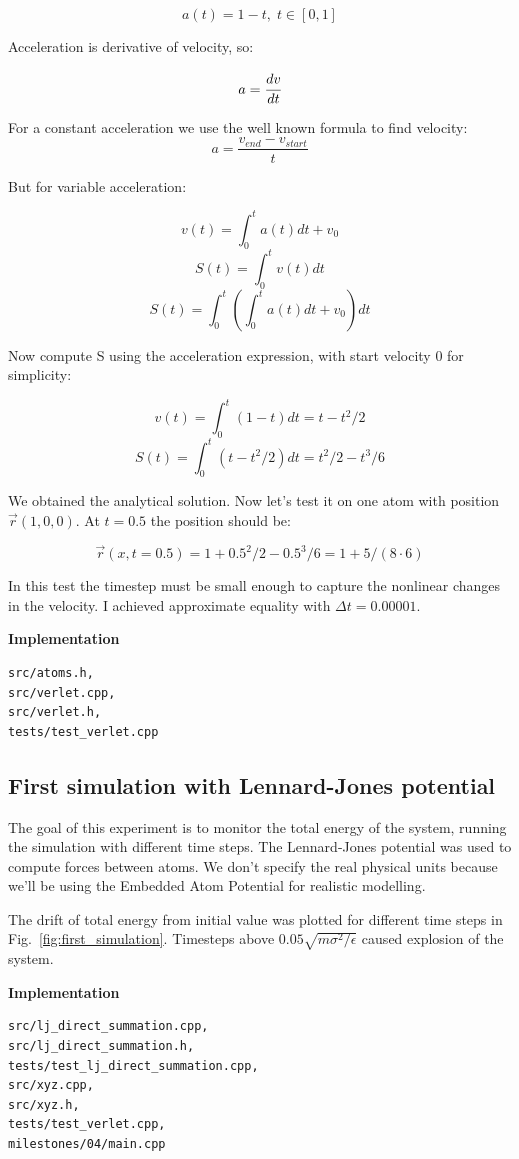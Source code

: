\documentclass[12pt,a4paper]{article}
\newcommand{\mat}[1]{\vec{#1}}
\begin{document}
\[ a(t) = 1 - t,\; t \in [0, 1] \]

Acceleration is derivative of velocity, so:

\[ a = \cfrac{dv}{dt} \]

For a constant acceleration we use the well known formula to find velocity: \[ a = \frac{v_{end}-v_{start}}{t} \]

But for variable acceleration:

\[ v(t) = \int_0^t a(t) dt + v_0 \]
\[ S(t) = \int_0^t v(t) dt \]
\[ S(t) = \int_0^t \left( \int_0^t a(t) dt + v_0 \right) dt\]

Now compute S using the acceleration expression, with start velocity 0 for simplicity:

\[ v(t) = \int_0^t (1-t) dt = t - t^2 / 2\]
\[ S(t) = \int_0^t (t - t^2/2) dt = t^2/2 - t^3/6 \]

We obtained the analytical solution. Now let's test it on one atom with position $\mat{r}(1, 0, 0)$. At $t=0.5$ the position should be:

\[ \mat{r}(x, t=0.5) = 1 + 0.5^2/2 - 0.5^3/6 = 1 + 5/(8 \cdot 6)\]

In this test the timestep must be small enough to capture the nonlinear changes in the velocity. I achieved approximate equality with $\Delta t = 0.00001$.

\clearpage

{\bf Implementation}
\begin{lstlisting}[breaklines]
src/atoms.h,
src/verlet.cpp,
src/verlet.h,
tests/test_verlet.cpp
\end{lstlisting}

\clearpage

\subsection*{First simulation with Lennard-Jones potential}

The goal of this experiment is to monitor the total energy of the system, running the simulation with different time steps. The Lennard-Jones potential was used to compute forces between atoms. We don't specify the real physical units because we'll be using the Embedded Atom Potential for realistic modelling.

The drift of total energy from initial value was plotted for different time steps in Fig.~\ref{fig:first_simulation}. Timesteps above $0.05 \sqrt{m\sigma^2 / \epsilon}$ caused explosion of the system.

{\bf Implementation}
\begin{lstlisting}[breaklines]
src/lj_direct_summation.cpp, 
src/lj_direct_summation.h,
tests/test_lj_direct_summation.cpp,
src/xyz.cpp,
src/xyz.h,
tests/test_verlet.cpp,
milestones/04/main.cpp
\end{lstlisting}
\end{document}
